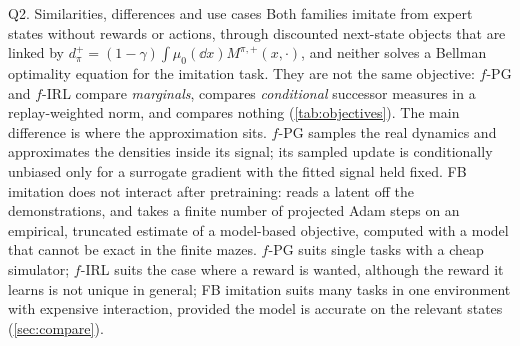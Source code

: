\begin{answerbox}{Q2. Similarities, differences and use cases}
Both families imitate from expert states without rewards or actions, through discounted next-state objects that are linked by $d^+_\pi=(1-\gamma)\int\mu_0(\dd x)M^{\pi,+}(x,\cdot)$, and neither solves a Bellman optimality equation for the imitation task.
They are not the same objective: $f$-PG and $f$-IRL compare \emph{marginals}, \DMFB{} compares \emph{conditional} successor measures in a replay-weighted norm, and \ERFB{} compares nothing (\cref{tab:objectives}).
The main difference is where the approximation sits. $f$-PG samples the real dynamics and approximates the densities inside its signal; its sampled update is conditionally unbiased only for a surrogate gradient with the fitted signal held fixed. FB imitation does not interact after pretraining: \ERFB{} reads a latent off the demonstrations, and \DMFB{} takes a finite number of projected Adam steps on an empirical, truncated estimate of a model-based objective, computed with a model that cannot be exact in the finite mazes.
$f$-PG suits single tasks with a cheap simulator; $f$-IRL suits the case where a reward is wanted, although the reward it learns is not unique in general; FB imitation suits many tasks in one environment with expensive interaction, provided the model is accurate on the relevant states (\cref{sec:compare}).
\end{answerbox}

